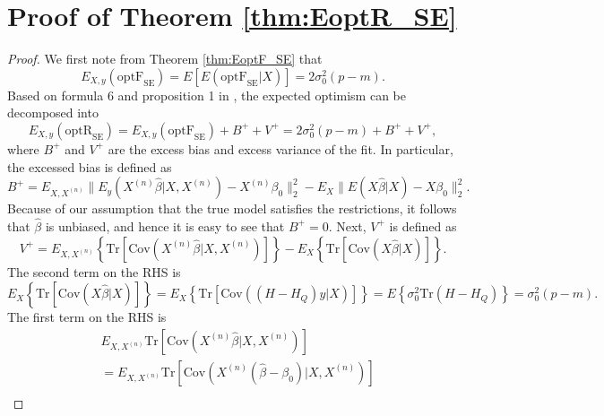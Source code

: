 \section{Proof of Theorem \ref{thm:EoptR_SE}}
\begin{proof}

We first note from Theorem \ref{thm:EoptF_SE} that
\begin{equation*}
E_{X,y}(\text{optF}_\text{SE}) = E \left[ E(\text{optF}_\text{SE} | X ) \right] = 2 \sigma_0^2(p-m).
\end{equation*}
Based on formula 6 and proposition 1 in , the expected optimism can be decomposed into 
\begin{equation*}
E_{X,y}(\text{optR}_\text{SE}) = E_{X,y}(\text{optF}_\text{SE}) + B^+ + V^+ = 2 \sigma_0^2(p-m) +  B^+ + V^+,
\end{equation*}
where $B^+$ and $V^+$ are the excess bias and excess variance of the fit. In particular, the excessed bias is defined as
\begin{equation*}
B^+ = E_{X,X^{(n)}} \big\lVert E_y( X^{(n)} \hat{\beta} \big | X, X^{(n)} ) - X^{(n)} \beta_0 \big\rVert_2^2 - E_X \big\lVert E( X \hat{\beta} \big | X ) - X \beta_0 \big\rVert_2^2.
\end{equation*}
Because of our assumption that the true model satisfies the restrictions, it follows that $\hat{\beta}$ is unbiased, and hence it is easy to see that $B^+=0$. Next, $V^+$ is defined as
\begin{equation*}
V^+ = E_{X,X^{(n)}} \left\{ \text{Tr} \left[ \text{Cov}\left( X^{(n)}\hat{\beta} \big | X, X^{(n)} \right) \right] \right\} - E_X \left\{ \text{Tr} \left[ \text{Cov}\left( X\hat{\beta} \big | X \right)  \right] \right\}.
\end{equation*}
The second term on the RHS is
\begin{equation*}
E_X \left\{  \text{Tr} \left[ \text{Cov} \left( X\hat{\beta} \big | X \right)  \right] \right\} = E_X \left\{ \text{Tr} \left[ \text{Cov} \left( (H-H_Q)y \big | X \right)  \right] \right\} = E\left\{  \sigma_0^2 \text{Tr} \left( H-H_Q  \right) \right\}= \sigma_0^2 (p-m).
\end{equation*}
The first term on the RHS is
\begin{equation*}
\begin{aligned}
& E_{X,X^{(n)}} \text{Tr} \left[ \text{Cov}\left( X^{(n)}\hat{\beta} \big | X, X^{(n)} \right) \right] \\
&= E_{X,X^{(n)}} \text{Tr} \left[ \text{Cov} \left( X^{(n)} (\hat{\beta} -\beta_0) \big | X, X^{(n)} \right) \right] \\

\end{aligned}
\end{equation*}
\end{proof}
